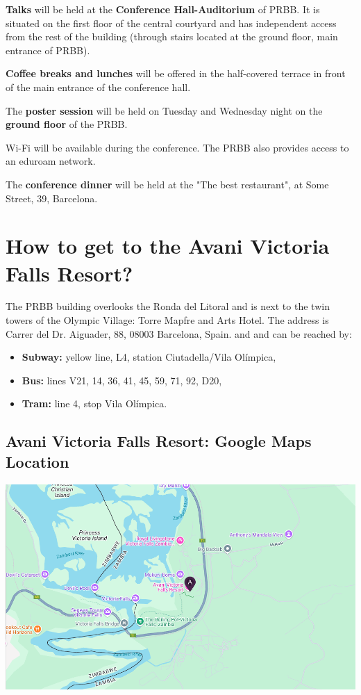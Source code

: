 \textbf{Talks} will be held at the \textbf{Conference Hall-Auditorium} of PRBB. It is situated on the first floor of the central courtyard and
has independent access from the rest of the building (through stairs located at the ground floor, main entrance of PRBB). 

\textbf{Coffee breaks and lunches} will be offered in the half-covered terrace in front of the main entrance of the conference hall.

The \textbf{poster session} will be held on Tuesday and Wednesday night on the \textbf{ground floor} of the PRBB. 

Wi-Fi will be available during the conference. The PRBB also provides access to an eduroam network.

The \textbf{conference dinner} will be held at the "The best restaurant", at Some Street, 39, Barcelona.

\section{How to get to the Avani Victoria Falls Resort?}

The PRBB building overlooks the Ronda del Litoral and is next to the twin towers of the Olympic Village: Torre Mapfre and Arts Hotel. The address is Carrer del Dr. Aiguader, 88, 08003 Barcelona, Spain. and and can be reached by:

\begin{itemize}

	\item \textbf{Subway:} yellow line, L4, station Ciutadella/Vila Ol\'{i}mpica,
	\item \textbf{Bus:} lines V21, 14, 36, 41, 45, 59, 71, 92, D20,
	\item \textbf{Tram:} line 4, stop Vila Ol\'{i}mpica.
	
\end{itemize}

\subsection{Avani Victoria Falls Resort: Google Maps Location}

\begin{center}
\includegraphics[width=\linewidth]{images/img-etd24-avani_victoria_fall_convention_centre_map.png}
\end{center}


